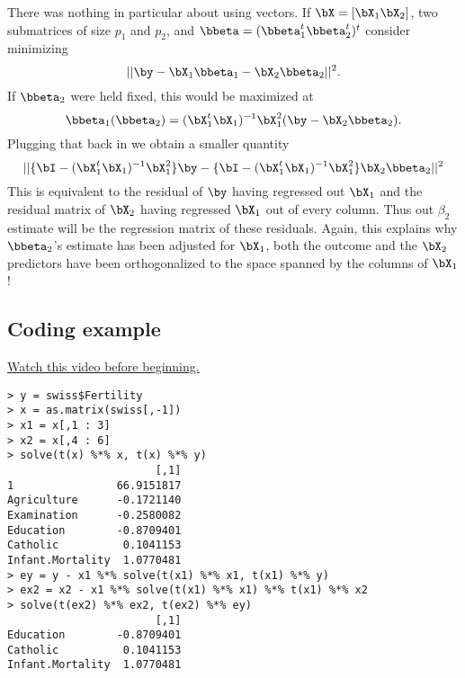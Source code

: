 There was nothing in particular about using vectors.
If $\bX = [\bX_1 \bX_2]$, two submatrices of size
$p_1$ and $p_2$, and $\bbeta = (\bbeta_1^t \bbeta_2^t)^t$ consider minimizing  
$$
|| \by - \bX_1 \bbeta_1 - \bX_2 \bbeta_2||^2.
$$
If $\bbeta_2$ were held fixed, this would be maximized
at 
$$
\bbeta_1(\bbeta_2) = 
(\bX_1^t \bX_1)^{-1} \bX_1^2 (\by - \bX_2 \bbeta_2).
$$
Plugging that back in we obtain a smaller quantity
$$
||\{\bI - (\bX_1^t \bX_1)^{-1} \bX_1^2\} \by
- \{\bI - (\bX_1^t \bX_1)^{-1} \bX_1^2 \}\bX_2 \bbeta_2
||^2
$$
This is equivalent to the residual of $\by$ having
regressed out $\bX_1$ and the residual matrix of
$\bX_2$ having regressed $\bX_1$ out of every column.
Thus out $\beta_2$ estimate will be the regression
matrix of these residuals. Again, this explains
why $\bbeta_2$'s estimate has been adjusted for
$\bX_1$, both the outcome and the $\bX_2$ predictors
have been orthogonalized to the space spanned
by the columns of $\bX_1$!


\subsection{Coding example}

\href{https://www.youtube.com/watch?v=qRfydAddY7M&list=PLpl-gQkQivXhdgUCdaUQcdb31CRe8Mm2y&index=27}{Watch this video before beginning.}

\begin{verbatim}
> y = swiss$Fertility
> x = as.matrix(swiss[,-1])
> x1 = x[,1 : 3]
> x2 = x[,4 : 6]
> solve(t(x) %*% x, t(x) %*% y)
                       [,1]
1                66.9151817
Agriculture      -0.1721140
Examination      -0.2580082
Education        -0.8709401
Catholic          0.1041153
Infant.Mortality  1.0770481
> ey = y - x1 %*% solve(t(x1) %*% x1, t(x1) %*% y)
> ex2 = x2 - x1 %*% solve(t(x1) %*% x1) %*% t(x1) %*% x2
> solve(t(ex2) %*% ex2, t(ex2) %*% ey)
                       [,1]
Education        -0.8709401
Catholic          0.1041153
Infant.Mortality  1.0770481
\end{verbatim}










